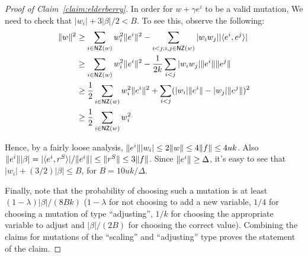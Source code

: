 \begin{proof}[Proof of Claim~\ref{claim:elderberry}]
In order for $w + \gamma e^i$ to be a valid mutation, We need to check that
$|w_i| + 3 |\beta|/2 < B$. To see this, observe the following:
\begin{align*}
\Vert w \Vert^2 &\geq \sum_{i \in \mathsf{NZ}(w)} w_i^2 \Vert e^i \Vert^2 - \sum_{i < j; i,
j \in \mathsf{NZ}(w)} |w_i w_j| |\langle e^i, e^j \rangle| \\
&\geq \sum_{i \in \mathsf{NZ}(w)} w_i^2 \Vert e^i \Vert^2 - \frac{1}{2k} \sum_{i < j}
|w_i w_j| \Vert e^i \Vert\Vert e^j \Vert \\
&\geq \frac{1}{2} \sum_{i \in \mathsf{NZ}(w)} w_i^2 \Vert e^i \Vert^2 + \sum_{i < j}
(|w_i| \Vert e^i \Vert - |w_j| \Vert e^j \Vert)^2 \\
&\geq \frac{1}{2} \sum_{i \in \mathsf{NZ}(w)} w_i^2
\end{align*}

Hence, by a fairly loose analysis, $\Vert e^i \Vert |w_i| \leq 2 \Vert w \Vert
\leq 4 \Vert f \Vert \leq 4uk$. Also $\Vert e^i \Vert |\beta| =
|\langle e^i, r^S \rangle|/\Vert e^i \Vert| \leq \Vert r^S \Vert \leq 3 \Vert f \Vert$.  Since
$\Vert e^i \Vert \geq \Delta$, it's easy to see that $|w_i| + (3/2) |\beta| \leq
B$, for $B = 10 uk/\Delta$.

Finally, note that the probability of choosing such a mutation is at least $(1 -
\lambda)|\beta|/(8Bk)$ ($1 - \lambda$ for not choosing to add a new variable,
$1/4$ for choosing a mutation of type ``adjusting'', $1/k$ for choosing the
appropriate variable to adjust and $|\beta|/(2B)$ for choosing the correct
value). Combining the claims for mutations of the ``scaling'' and ``adjusting''
type proves the statement of the claim.
\end{proof}
